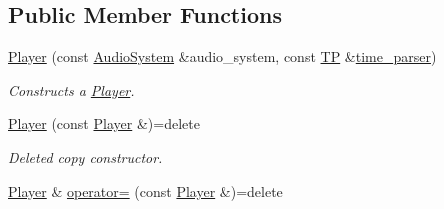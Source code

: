 \subsection*{Public Member Functions}
\begin{DoxyCompactItemize}
\item 
\hyperlink{classPlayer_a19fcaf8a2864565adcde9b955a890431}{Player} (const \hyperlink{classAudioSystem}{Audio\+System} \&audio\+\_\+system, const \hyperlink{classPlayer_ab2c65f4a7cbaf6aab6fafbb5633a42c4}{T\+P} \&\hyperlink{classPlayer_ad7c6ccd4156c01d419825abe6704fca7}{time\+\_\+parser})
\begin{DoxyCompactList}\small\item\em Constructs a \hyperlink{classPlayer}{Player}. \end{DoxyCompactList}\item 
\hypertarget{classPlayer_ae8015d1f08ba69d663cfdaea1a64d1a4}{\hyperlink{classPlayer_ae8015d1f08ba69d663cfdaea1a64d1a4}{Player} (const \hyperlink{classPlayer}{Player} \&)=delete}\label{classPlayer_ae8015d1f08ba69d663cfdaea1a64d1a4}

\begin{DoxyCompactList}\small\item\em Deleted copy constructor. \end{DoxyCompactList}\item 
\hypertarget{classPlayer_ab81d34e4adb4e329d26b1635d866462d}{\hyperlink{classPlayer}{Player} \& \hyperlink{classPlayer_ab81d34e4adb4e329d26b1635d866462d}{operator=} (const \hyperlink{classPlayer}{Player} \&)=delete}\label{classPlayer_ab81d34e4adb4e329d26b1635d866462d}


\end{DoxyCompactItemize}
